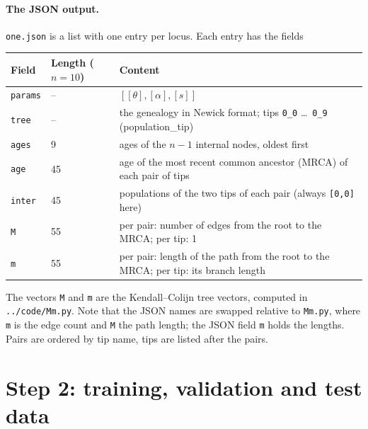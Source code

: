 \documentclass[11pt]{article}
\newcommand{\file}[1]{\texttt{#1}}
\begin{document}
\paragraph{The JSON output.}
\file{one.json} is a list with one entry per locus. Each entry has the
fields
\begin{center}
\small
\begin{tabular}{@{}llp{}@{}}
\toprule
Field & Length ($n{=}10$) & Content \\
\midrule
\texttt{params} & -- & $[[\theta],[\alpha],[s]]$ \\
\texttt{tree}   & -- & the genealogy in Newick format; tips \texttt{0\_0} \ldots\ \texttt{0\_9} (population\_tip) \\
\texttt{ages}   & 9  & ages of the $n{-}1$ internal nodes, oldest first \\
\texttt{age}    & 45 & age of the most recent common ancestor (MRCA) of each pair of tips \\
\texttt{inter}  & 45 & populations of the two tips of each pair (always \texttt{[0,0]} here) \\
\texttt{M}      & 55 & per pair: number of edges from the root to the MRCA; per tip: 1 \\
\texttt{m}      & 55 & per pair: length of the path from the root to the MRCA; per tip: its branch length \\
\bottomrule
\end{tabular}
\end{center}
The vectors \texttt{M} and \texttt{m} are the Kendall--Colijn tree
vectors, computed in \file{../code/Mm.py}.
Note that the JSON names are swapped relative to \file{Mm.py}, where
\texttt{m} is the edge count and \texttt{M} the path length; the JSON
field \texttt{m} holds the lengths.
Pairs are ordered by tip name, tips are listed after the pairs.

\section{Step 2: training, validation and test data}\label{sec:step2}
\end{document}
